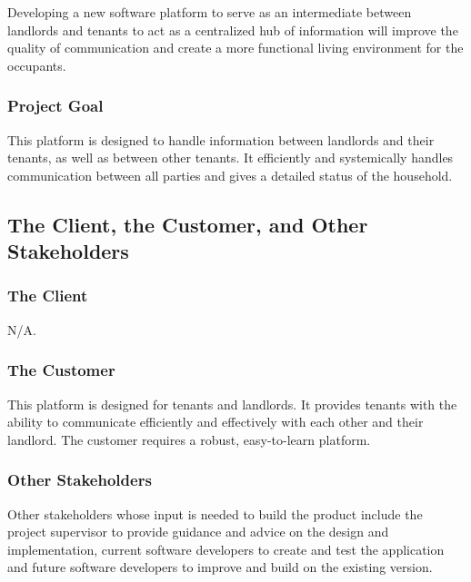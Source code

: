 \documentclass[12pt]{article}
\begin{document}
\noindent Developing a new software platform to serve as an intermediate between 
landlords and tenants to act as a centralized hub of information will improve 
the quality of communication and create a more functional living environment 
for the occupants.

\subsubsection{Project Goal}
This platform is designed to handle information between landlords and their 
tenants, as well as between other tenants. It efficiently and systemically 
handles communication between all parties and gives a detailed status of the household.

\subsection{The Client, the Customer, and Other Stakeholders}
\subsubsection {The Client}
  N/A.
\subsubsection {The Customer}
This platform is designed for tenants and landlords. It provides tenants with the ability to communicate efficiently and effectively with each other and their landlord. The customer requires a robust, easy-to-learn platform.
\subsubsection {Other Stakeholders}
Other stakeholders whose input is needed to build the product include the project supervisor to provide guidance and advice on the design and implementation, current software developers to create and test the application and future software developers to improve and build on the existing version.
\end{document}
